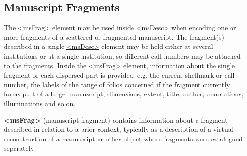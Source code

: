 \subsection[{Manuscript Fragments}]{Manuscript Fragments}\label{msfg}\par
The \hyperref[TEI.msFrag]{<msFrag>} element may be used inside \hyperref[TEI.msDesc]{<msDesc>} when encoding one or more fragments of a scattered or fragmented manuscript. The fragment(s) described in a single \hyperref[TEI.msDesc]{<msDesc>} element may be held either at several institutions or at a single institution, so different call numbers may be attached to the fragments. Inside the \hyperref[TEI.msFrag]{<msFrag>} element, information about the single fragment or each dispersed part is provided: e.g. the current shelfmark or call number, the labels of the range of folios concerned if the fragment currently forms part of a larger manuscript, dimensions, extent, title, author, annotations, illuminations and so on. 
\begin{sansreflist}
  
\item [\textbf{<msFrag>}] (manuscript fragment) contains information about a fragment described in relation to a prior context, typically as a description of a virtual reconstruction of a manuscript or other object whose fragments were catalogued separately
\end{sansreflist}
\par

